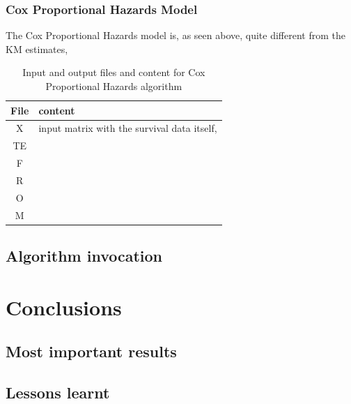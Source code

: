 \documentclass[11pt]{article} %
\begin{document}
    \subsubsection*{Cox Proportional Hazards Model}

      The Cox Proportional Hazards model is, as seen above, quite different from the KM estimates, 

      \begin{table}[!ht]
        \centering
        \begin{tabular}{|c|p{\textwidth}|}
          \hline
            File & content \\ \hline
            X & input matrix with the survival data itself,  \\ \hline
            TE & \\ \hline
            F &  \\ \hline
            R & \\ \hline
            O & \\ \hline
            M & \\ \hline
        \end{tabular}
        \caption{Input and output files and content for Cox Proportional Hazards algorithm}
        \label{tab:Cox_IO_files}
      \end{table}

  \subsection{Algorithm invocation}


\section{Conclusions}
  \label{sec:conclusions}

  \subsection{Most important results}

  \subsection{Lessons learnt}

\newpage
\nocite{*}
\printbibliography
\end{document}
